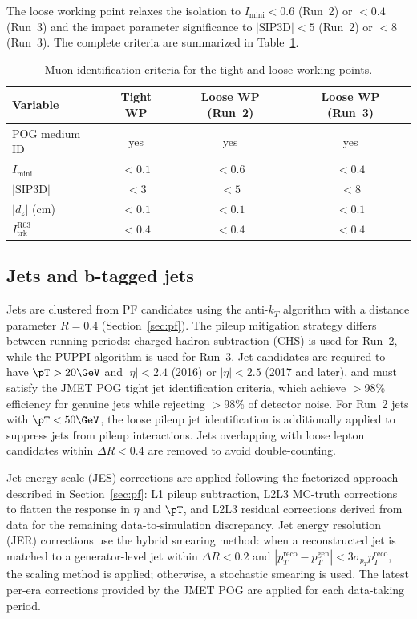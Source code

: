 The loose working point relaxes the isolation to $I_\text{mini} < 0.6$ (Run~2) or $< 0.4$ (Run~3) and the impact parameter significance to $|\text{SIP3D}| < 5$ (Run~2) or $< 8$ (Run~3). The complete criteria are summarized in Table~\ref{tab:muon_id}.

\begin{table}[htbp]
\centering
\caption{Muon identification criteria for the tight and loose working points.}
\label{tab:muon_id}
\small
\begin{tabular}{lccc}
\hline\hline
Variable & Tight WP & Loose WP (Run~2) & Loose WP (Run~3) \\
\hline
POG medium ID & yes & yes & yes \\
$I_\text{mini}$ & $<0.1$ & $<0.6$ & $<0.4$ \\
$|\text{SIP3D}|$ & $<3$ & $<5$ & $<8$ \\
$|d_z|$ (cm) & $<0.1$ & $<0.1$ & $<0.1$ \\
$I_\text{trk}^\text{R03}$ & $<0.4$ & $<0.4$ & $<0.4$ \\
\hline\hline
\end{tabular}
\end{table}

\subsection{Jets and b-tagged jets}
\label{ssec:jets}

Jets are clustered from PF candidates using the anti-$k_T$ algorithm with a distance parameter $R = 0.4$ (Section~\ref{sec:pf}). The pileup mitigation strategy differs between running periods: charged hadron subtraction (CHS) is used for Run~2, while the PUPPI algorithm is used for Run~3. Jet candidates are required to have $\pT > 20\GeV$ and $|\eta| < 2.4$ (2016) or $|\eta| < 2.5$ (2017 and later), and must satisfy the JMET POG tight jet identification criteria, which achieve $>$98\% efficiency for genuine jets while rejecting $>$98\% of detector noise. For Run~2 jets with $\pT < 50\GeV$, the loose pileup jet identification is additionally applied to suppress jets from pileup interactions. Jets overlapping with loose lepton candidates within $\Delta R < 0.4$ are removed to avoid double-counting.

Jet energy scale (JES) corrections are applied following the factorized approach described in Section~\ref{sec:pf}: L1 pileup subtraction, L2L3 MC-truth corrections to flatten the response in $\eta$ and $\pT$, and L2L3 residual corrections derived from data for the remaining data-to-simulation discrepancy. Jet energy resolution (JER) corrections use the hybrid smearing method: when a reconstructed jet is matched to a generator-level jet within $\Delta R < 0.2$ and $|p_T^\text{reco} - p_T^\text{gen}| < 3\sigma_{p_T} p_T^\text{reco}$, the scaling method is applied; otherwise, a stochastic smearing is used. The latest per-era corrections provided by the JMET POG are applied for each data-taking period.

